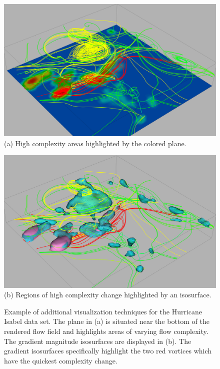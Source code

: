 \documentclass{egpubl}
\begin{document}
\begin{figure}[h]
        \centering
                \begin{minipage}{1\linewidth}
                        \includegraphics[height = .62\linewidth]{Images/isa_plane_crop.png}\\(a) High complexity areas highlighted by the colored plane. \vspace{0.2em}
                \end{minipage}
                \begin{minipage}{1\linewidth}
                        \includegraphics[height = .62\linewidth]{Images/isa_grad_crop.png}\\(b) Regions of high complexity change highlighted by an isosurface. \vspace{0.2em}
                \end{minipage}
        \caption{Example of additional visualization techniques for the Hurricane Isabel data set. The plane in (a) is situated near the bottom of the rendered flow field and highlights areas of varying flow complexity. The gradient magnitude isosurfaces are displayed in (b). The gradient isosurfaces specifically highlight the two red vortices which have the quickest complexity change.}
        \label{fig:isa_lines}
\end{figure}
\end{document}
